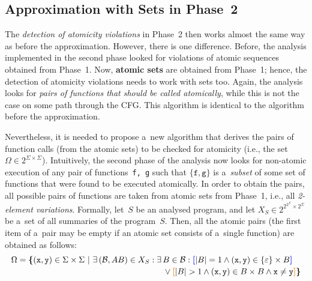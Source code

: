 \subsection{Approximation with Sets in Phase~2}

The \emph{detection of atomicity violations} in Phase~2 then works almost the same way as before the approximation. However, there is one difference. Before, the analysis implemented in the second phase looked for violations of atomic sequences obtained from Phase~1. Now, \textbf{atomic sets} are obtained from Phase~1; hence, the detection of atomicity violations needs to work with sets too. Again, the analysis looks for \emph{pairs of functions that should be called atomically}, while this is not the case on some path through the CFG. This algorithm is identical to the algorithm before the approximation.

Nevertheless, it is needed to propose a~new algorithm that derives the pairs of function calls (from the atomic sets) to be checked for atomicity (i.e., the set~$ \Omega \in 2^{\Sigma \times \Sigma} $). Intuitively, the second phase of the analysis now looks for non-atomic execution of any pair of functions~\texttt{f, g} such that $ \{\mathtt{f, g}\} $ is a~\emph{subset} of some set of functions that were found to be executed atomically. In order to obtain the pairs, all possible pairs of functions are taken from atomic sets from Phase~1, i.e., all \emph{2-element variations}. Formally, let~$ S $ be an analysed program, and let $ X_S \in 2^{2^{2^\Sigma} \times 2^\Sigma} $ be a~set of all summaries of the program~$ S $. Then, all the atomic pairs (the first item of a~pair may be empty if an atomic set consists of a~single function) are obtained as follows: 
$$
\begin{multlined}
    \Omega = \bb{\{}(\mathtt{x}, \mathtt{y}) \in \Sigma \times \Sigma\ |\ \exists\,(\mathcal{B}, AB) \in X_S : \exists\,B \in \mathcal{B} : \bA{[}|B| = 1 \wedge (\mathtt{x}, \mathtt{y}) \in \{\varepsilon\} \times B\bA{]} \\
%
    \vee \bB{[}|B| > 1 \wedge (\mathtt{x}, \mathtt{y}) \in B \times B \wedge \mathtt{x} \neq \mathtt{y}%
%
    \bB{]}\bb{\}}
\end{multlined}
$$


